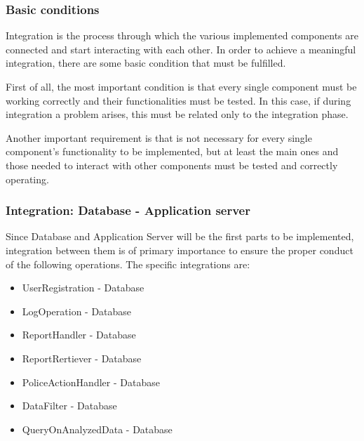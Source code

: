 \subsubsection{Basic conditions}
Integration is the process through which the various implemented components are connected and start interacting with each other.
In order to achieve a meaningful integration, there are some basic condition that must be fulfilled. \par
First of all, the most important condition is that every single component must be working correctly and their functionalities must be tested. In this case, if during integration a problem arises, this must be related only to the integration phase. \par
Another important requirement is that is not necessary for every single component's functionality to be implemented, but at least the main ones and those needed to interact with other components must be tested and correctly operating.

\subsubsection{Integration: Database - Application server}
Since Database and Application Server will be the first parts to be implemented, integration between them is of primary importance to ensure the proper conduct of the following operations.
The specific integrations are:
\begin{itemize}
	\item UserRegistration - Database
	\item LogOperation - Database
	\item ReportHandler - Database
	\item ReportRertiever - Database
	\item PoliceActionHandler - Database
	\item DataFilter - Database
	\item QueryOnAnalyzedData - Database
\end{itemize}

